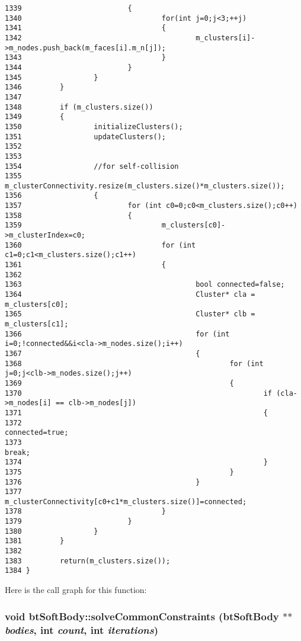 \begin{Code}
\begin{verbatim}
1339                         {
1340                                 for(int j=0;j<3;++j)
1341                                 {
1342                                         m_clusters[i]->m_nodes.push_back(m_faces[i].m_n[j]);
1343                                 }
1344                         }
1345                 }
1346         }
1347 
1348         if (m_clusters.size())
1349         {
1350                 initializeClusters();
1351                 updateClusters();
1352 
1353 
1354                 //for self-collision
1355                 m_clusterConnectivity.resize(m_clusters.size()*m_clusters.size());
1356                 {
1357                         for (int c0=0;c0<m_clusters.size();c0++)
1358                         {
1359                                 m_clusters[c0]->m_clusterIndex=c0;
1360                                 for (int c1=0;c1<m_clusters.size();c1++)
1361                                 {
1362                                         
1363                                         bool connected=false;
1364                                         Cluster* cla = m_clusters[c0];
1365                                         Cluster* clb = m_clusters[c1];
1366                                         for (int i=0;!connected&&i<cla->m_nodes.size();i++)
1367                                         {
1368                                                 for (int j=0;j<clb->m_nodes.size();j++)
1369                                                 {
1370                                                         if (cla->m_nodes[i] == clb->m_nodes[j])
1371                                                         {
1372                                                                 connected=true;
1373                                                                 break;
1374                                                         }
1375                                                 }
1376                                         }
1377                                         m_clusterConnectivity[c0+c1*m_clusters.size()]=connected;
1378                                 }
1379                         }
1380                 }
1381         }
1382 
1383         return(m_clusters.size());
1384 }
\end{verbatim}
\end{Code}




Here is the call graph for this function:\hypertarget{classbt_soft_body_e8a2fc459b2afc985fbb03c1b0203bec}{
\subsubsection[solveCommonConstraints]{\setlength{\rightskip}{0pt plus 5cm}void btSoftBody::solveCommonConstraints ({\bf btSoftBody} $\ast$$\ast$ {\em bodies}, \/  int {\em count}, \/  int {\em iterations})}}
\label{classbt_soft_body_e8a2fc459b2afc985fbb03c1b0203bec}




